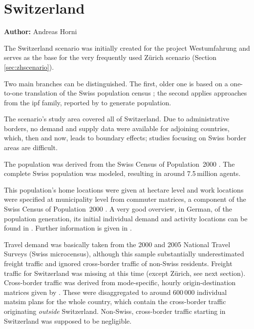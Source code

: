 \section{Switzerland}
\hfill \textbf{Author:} Andreas Horni


The Switzerland scenario was initially created for the project Westumfahrung \citep[][]{BalmerEtAl_ResRep_bdktzrh_2009} and serves as the base for the very frequently used Zürich scenario (Section \ref{sec:zhscenario}). 

Two main branches can be distinguished. The first, older one is based on a one-to-one translation of the Swiss population census \citep[][]{BfS_VZ_2000}; the second applies approaches from the \gls{ipf} family, reported by \citet[][]{MuellerKAxhausen_TechRep_IVT_2013, Mueller_unpub_LATSIS_2012, Mueller_unpub_ETC_2011, Mueller_unpub_STRC_2011, Mueller_unpub_IATBR_2012} to generate population.

The scenario's study area covered all of Switzerland. Due to administrative borders, no demand and supply data were available for adjoining countries, which, then and now, leads to boundary effects; studies focusing on Swiss border areas are difficult.

The population was derived from the Swiss Census of Population~2000 \citep[][]{BfS_VZ_2000}. The complete Swiss population was modeled, resulting in around 7.5\,million agents. 

This population's home locations were given at hectare level and work locations were specified at municipality level from commuter matrices, a component of the Swiss Census of Population~2000 \citep[][p.35]{BalmerEtAl_ResRep_bdktzrh_2009}. A very good overview, in German, of the population generation, its initial individual demand and activity locations can be found in \citet{MeisterEtAl_SVT_2009}. Further information is given in \citet[][]{CiariEtAl_STRC_2008, MeisterEtAl_WCTRS_2010, BalmerEtAl_ResRep_bdktzrh_2009, BalmerEtAl_ResRep_datapuls_2010, BalmerEtAl_HEUREKA_2008}.

Travel demand was basically taken from the 2000 and 2005 National Travel Surveys \citep[][]{BfS-MZ2005_manual_2006} (Swiss microcensus), although this sample substantially underestimated freight traffic and ignored cross-border traffic of non-Swiss residents. Freight traffic for Switzerland was missing at this time (except Zürich, see next section). Cross-border traffic was derived from mode-specific, hourly origin-destination matrices given by \citet[][]{VrticEtAl_ResRep_UVEK_2007}. These were disaggregated to around 600\,000 individual \gls{matsim} plans for the whole country, which contain the cross-border traffic originating \emph{outside} Switzerland. Non-Swiss, cross-border traffic starting in Switzerland was supposed to be negligible. 

